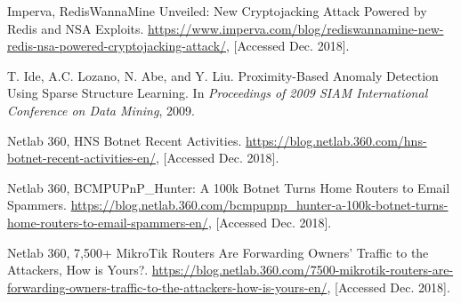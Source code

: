 \documentclass[conference]{IEEEtran}
\begin{document}
\begin{thebibliography}{99}
Imperva, RedisWannaMine Unveiled: New Cryptojacking Attack Powered by Redis and NSA Exploits. \url{https://www.imperva.com/blog/rediswannamine-new-redis-nsa-powered-cryptojacking-attack/}, [Accessed Dec. 2018].

T. Ide, A.C. Lozano, N. Abe, and Y. Liu. Proximity-Based Anomaly Detection Using Sparse Structure Learning. In {\it Proceedings of 2009 SIAM International Conference on Data Mining}, 2009.

Netlab 360, HNS Botnet Recent Activities. \url{https://blog.netlab.360.com/hns-botnet-recent-activities-en/}, [Accessed Dec. 2018].

Netlab 360, BCMPUPnP\_Hunter: A 100k Botnet Turns Home Routers to Email Spammers. \url{https://blog.netlab.360.com/bcmpupnp_hunter-a-100k-botnet-turns-home-routers-to-email-spammers-en/}, [Accessed Dec. 2018].

Netlab 360, 7,500+ MikroTik Routers Are Forwarding Owners' Traffic to the Attackers, How is Yours?. \url{https://blog.netlab.360.com/7500-mikrotik-routers-are-forwarding-owners-traffic-to-the-attackers-how-is-yours-en/}, [Accessed Dec. 2018].


\end{thebibliography}
\end{document}
